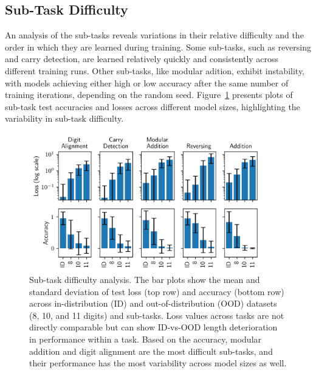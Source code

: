 \subsection{Sub-Task Difficulty}

An analysis of the sub-tasks reveals variations in their relative difficulty and the order in which they are learned during training. Some sub-tasks, such as reversing and carry detection, are learned relatively quickly and consistently across different training runs. Other sub-tasks, like modular adition, exhibit instability, with models achieving either high or low accuracy after the same number of training iterations, depending on the random seed. Figure~\ref{fig:subtask_difficulty} presents plots of sub-task test accuracies and losses across different model sizes, highlighting the variability in sub-task difficulty.

\begin{figure}[htb!]
    \centering
    \includegraphics[width=0.9\textwidth]{fig/subtask_difficulty.png}
    \caption{Sub-task difficulty analysis. The bar plots show the mean and standard deviation of test loss (top row) and accuracy (bottom row) across in-distribution (ID) and out-of-distribution (OOD) datasets (8, 10, and 11 digits) and sub-tasks. Loss values across tasks are not directly comparable but can show ID-vs-OOD length deterioration in performance within a task. Based on the accuracy, modular addition and digit alignment are the most difficult sub-tasks, and their performance has the most variability across model sizes as well.}
    \label{fig:subtask_difficulty}
\end{figure}

